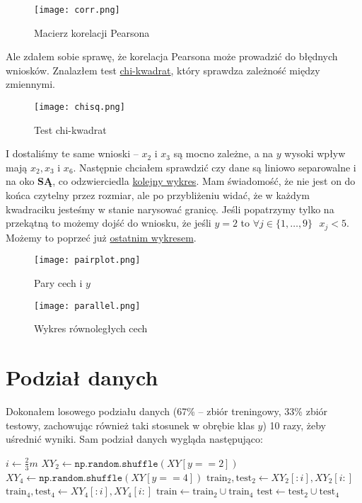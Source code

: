 \documentclass[a4paper,12pt]{article}
\begin{document}
\begin{figure}[H]
    \centering
    \texttt{[image: corr.png]} 
    \caption{Macierz korelacji Pearsona}
    \label{fig:corr}
\end{figure}

\!\!\!\!\!\!\!\!Ale zdałem sobie sprawę, że korelacja Pearsona może prowadzić do błędnych wniosków. Znalazłem test \hyperref[fig:chisq]{chi-kwadrat}, który sprawdza zależność między zmiennymi.

\begin{figure}[H]
    \centering
    \texttt{[image: chisq.png]}
    \caption{Test chi-kwadrat}
    \label{fig:chisq}
\end{figure}

\!\!\!\!\!\!\!\!I dostaliśmy te same wnioski -- $x_2$ i $x_3$ są mocno zależne, a na $y$ wysoki wpływ mają $x_2, x_3$ i $x_6$. Następnie chciałem sprawdzić czy dane są liniowo separowalne i na oko \textbf{SĄ}, co odzwierciedla \hyperref[fig:pair]{kolejny wykres}. Mam świadomość, że nie jest on do końca czytelny przez rozmiar, ale po przybliżeniu widać, że w każdym kwadraciku jesteśmy w stanie narysować granicę. Jeśli popatrzymy tylko na przekątną to możemy dojść do wniosku, że  jeśli $y=2$ to $\forall j \in \{1,\dots,9\} \text{ } x_j<5$. Możemy to poprzeć już \hyperref[fig:parallel]{ostatnim wykresem}.

\begin{figure}
    \centering
    \texttt{[image: pairplot.png]}
    \caption{Pary cech i $y$}
    \label{fig:pair}
\end{figure}

\begin{figure}[H]
    \centering
    \texttt{[image: parallel.png]}
    \caption{Wykres równoległych cech}
    \label{fig:parallel}
\end{figure}

\section{Podział danych}
Dokonałem losowego podziału danych (67\% -- zbiór treningowy, 33\% zbiór testowy, zachowując również taki stosunek w obrębie klas $y$) 10 razy, żeby uśrednić wyniki.
Sam podział danych wygląda następująco:
\begin{algorithmic}[1]
\State $i \gets \frac{2}{3}m$
\State $XY_2 \gets \texttt{np.random.shuffle}(XY[y == 2])$
\State $XY_4 \gets \texttt{np.random.shuffle}(XY[y == 4])$
\State $\mathrm{train}_2, \mathrm{test}_2 \gets XY_2[:i], XY_2[i:]$
\State $\mathrm{train}_4, \mathrm{test}_4 \gets XY_4[:i], XY_4[i:]$
\State $\mathrm{train} \gets \mathrm{train}_2 \cup \mathrm{train}_4$
\State $\mathrm{test} \gets \mathrm{test}_2 \cup \mathrm{test}_4$
\end{algorithmic}
\end{document}
